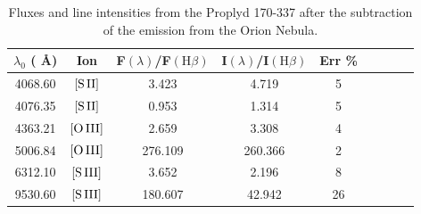 \documentclass[fleqn,usenatbib]{mnras}
\begin{document}
\begin{table}
\caption{Fluxes and line intensities from the Proplyd 170-337 after the subtraction of the emission from the Orion Nebula.} 
\label{tab:fluxes_proplyd}
\begin{tabular}{ccccccccc} 
\hline
$\lambda_0$ ( \AA ) & Ion & F$\left( \lambda \right)$/F$\left( \mbox{H}\beta \right)$ & I$\left( \lambda \right)$/I$\left( \mbox{H}\beta \right)$ & Err \% \\
\hline
4068.60 & $\mbox{[S}\thinspace \mbox{II]}$ & 3.423 & 4.719 & 5  \\
4076.35 & $\mbox{[S}\thinspace \mbox{II]}$ & 0.953 & 1.314 & 5  \\
4363.21 & $\mbox{[O}\thinspace \mbox{III]}$ & 2.659 & 3.308 & 4 \\
5006.84 & $\mbox{[O}\thinspace \mbox{III]}$ & 276.109 & 260.366 & 2 \\
6312.10 & $\mbox{[S}\thinspace \mbox{III]}$ & 3.652 & 2.196 & 8 &  \\
9530.60 & $\mbox{[S}\thinspace \mbox{III]}$ & 180.607 & 42.942 & 26 \\
\hline
\end{tabular}
\end{table}






\bsp	%
\label{lastpage}
\end{document}
